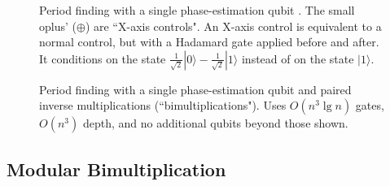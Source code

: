 \documentclass[twocolumn,longbibliography]{quantumarticle-customized}
\begin{document}
\begin{figure}
  \centering
  \caption{
	Period finding with a single phase-estimation qubit \cite{beauregard2003}.
	The small oplus' ({\tiny $\oplus$}) are ``X-axis controls".
	An X-axis control is equivalent to a normal control, but with a Hadamard gate applied before and after.
	It conditions on the state $\frac{1}{\sqrt 2}|0\rangle - \frac{1}{\sqrt 2}|1\rangle$ instead of on the state $|1\rangle$.
  }
  \label{fig:period-finding-solo-phase-qubit}
\end{figure}

\begin{figure}
  \centering
  \caption{
	Period finding with a single phase-estimation qubit and paired inverse multiplications (``bimultiplications").
	Uses $O(n^3 \lg n)$ gates, $O(n^3)$ depth, and no additional qubits beyond those shown.
  }
  \label{fig:period-finding-solo-phase-qubit-explicit-dirty-register}
\end{figure}


\subsection{Modular Bimultiplication}
\end{document}

